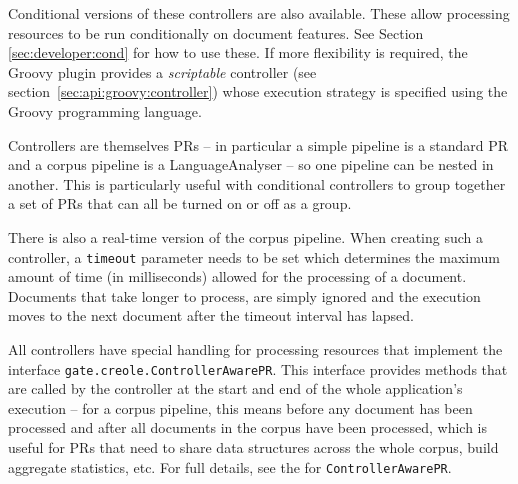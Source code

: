 Conditional versions of these controllers are also available. These allow
processing resources to be run conditionally on document features. 
See Section \ref{sec:developer:cond} for how to use these.  If more flexibility
is required, the Groovy plugin provides a \emph{scriptable} controller (see
section~\ref{sec:api:groovy:controller}) whose execution strategy is specified
using the Groovy programming language.

Controllers are themselves PRs -- in particular a simple pipeline is a standard
PR and a corpus pipeline is a LanguageAnalyser -- so one pipeline can be nested
in another.  This is particularly useful with conditional controllers to group
together a set of PRs that can all be turned on or off as a group.

There is also a real-time version of the corpus pipeline. When creating such
a controller, a {\tt timeout} parameter needs to be set which determines the
maximum amount of time (in milliseconds) allowed for the processing of a
document. Documents that take longer to process, are simply ignored and the
execution moves to the next document after the timeout interval has lapsed.

All controllers have special handling for processing resources that implement
the interface \texttt{gate.creole.ControllerAwarePR}.  This interface provides
methods that are called by the controller at the start and end of the whole
application's execution -- for a corpus pipeline, this means before any
document has been processed and after all documents in the corpus have been
processed, which is useful for PRs that need to share data structures across
the whole corpus, build aggregate statistics, etc.  For full details, see the
for \texttt{ControllerAwarePR}.
%



\mbox{ }

